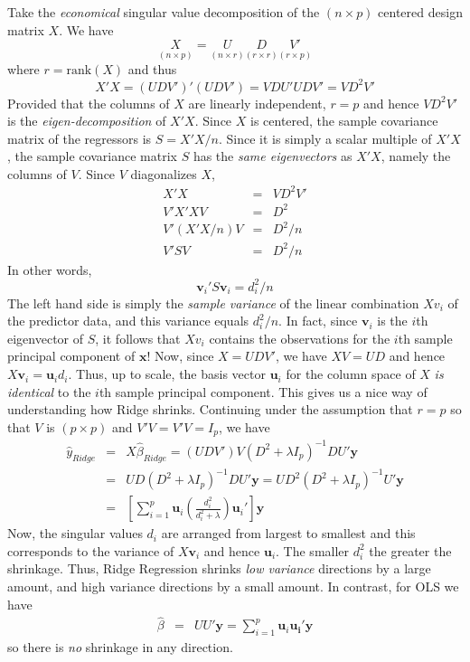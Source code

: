\documentclass[12pt]{article}
\theoremstyle{definition}
\begin{document}
Take the \emph{economical} singular value decomposition of the $(n\times p)$ centered  design matrix $X$. We have
	$$\underset{(n\times p)}{X} = \underset{(n\times r)}{U} \underset{(r\times r)}{D} \underset{(r\times p)}{V'}$$
where $r = \mbox{rank}(X)$ and thus
	$$X'X = (UDV')'(UDV') = VDU'UDV' = VD^2V'$$
Provided that the columns of $X$ are linearly independent, $r = p$ and hence $VD^2 V'$ is the \emph{eigen-decomposition} of $X'X$. Since $X$ is centered, the sample covariance matrix of the regressors is $S = X'X/n$. Since it is simply a scalar multiple of $X'X$, the sample covariance matrix $S$ has the \emph{same eigenvectors} as $X'X$, namely the columns of $V$. Since $V$ diagonalizes $X$,
	\begin{eqnarray*}
		X'X &=& VD^2 V'\\
		V'X'X V &=& D^2\\
		V' (X'X/n)V &=& D^2/n\\
		V' S V &=& D^2/n
	\end{eqnarray*}
In other words,
	$$\textbf{v}_i' S \textbf{v}_i = d_i^2/n$$
The left hand side is simply the \emph{sample variance} of the linear combination $X v_i$ of the predictor data, and this variance equals $d_i^2/n$. In fact, since $\mathbf{v}_i$ is the $i$th eigenvector of $S$, it follows that $X v_i$ contains the observations for the $i$th sample principal component of $\mathbf{x}$! Now, since $X = UDV'$, we have $XV = UD$ and hence $X \mathbf{v}_i = \mathbf{u}_i d_i$. Thus, up to scale, the basis vector $\mathbf{u}_i$ for the column space of $X$ \emph{is identical} to the $i$th sample principal component. This gives us a nice way of understanding how Ridge shrinks. Continuing under the assumption that $r = p$ so that $V$ is $(p\times p)$ and $V'V = V'V = I_p$, we have
\begin{eqnarray*}
	\widehat{y}_{Ridge} &=& X\widehat{\beta}_{Ridge} = (UDV')V(D^2 + \lambda I_p)^{-1}DU'\mathbf{y}\\
	&=& UD(D^2 + \lambda I_p)^{-1}DU'\mathbf{y} = UD^2(D^2 + \lambda I_p)^{-1}U'\mathbf{y}\\
	&=&\left[\sum_{i=1}^p \mathbf{u}_i \left(\frac{d_i^2}{d_i^2 +\lambda}\right)\mathbf{u}_i' \right] \mathbf{y}
\end{eqnarray*}
Now, the singular values $d_i$ are arranged from largest to smallest and this corresponds to the variance of $X \mathbf{v}_i$ and hence $\mathbf{u}_i$. The smaller $d_i^2$ the greater the shrinkage. Thus, Ridge Regression shrinks \emph{low variance} directions by a large amount, and high variance directions by a small amount. In contrast, for OLS we have 
	\begin{eqnarray*}
		\widehat{\beta} &=& UU'\mathbf{y} = \sum_{i=1}^p \mathbf{u}_i \mathbf{u_i}' \mathbf{y}
	\end{eqnarray*}
so there is \emph{no} shrinkage in any direction.
\end{document}
